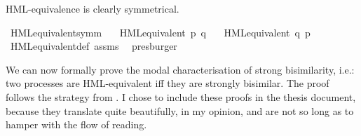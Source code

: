 \begin{isabellebody}
\begin{isamarkuptext}
HML-equivalence is clearly symmetrical.%
\end{isamarkuptext}\isamarkuptrue%
\isamarkupfalse%
\ HML{\isacharunderscore}{\kern0pt}equivalent{\isacharunderscore}{\kern0pt}symm{\isacharcolon}{\kern0pt}\isanewline
\ \ \ {\isacartoucheopen}HML{\isacharunderscore}{\kern0pt}equivalent\ p\ q{\isacartoucheclose}\isanewline
\ \ \ {\isacartoucheopen}HML{\isacharunderscore}{\kern0pt}equivalent\ q\ p{\isacartoucheclose}\isanewline
%
\isadelimproof
\ \ %
\endisadelimproof
%
\isatagproof
{}\isamarkupfalse%
\ HML{\isacharunderscore}{\kern0pt}equivalent{\isacharunderscore}{\kern0pt}def\ assms\ \isamarkupfalse%
\ presburger%
\endisatagproof
{\isafoldproof}%
%
\isadelimproof
%
\endisadelimproof
%
\begin{isamarkuptext}%
We can now formally prove the modal characterisation of strong bisimilarity, i.e.: two processes are HML-equivalent iff they are strongly bisimilar. The proof follows the strategy from \cite{resyst}. I chose to include these proofs in the thesis document, because they translate quite beautifully, in my opinion, and are not so long as to hamper with the flow of reading.


\end{isamarkuptext}
\end{isabellebody}
